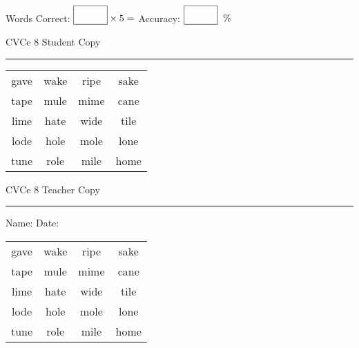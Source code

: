 \documentclass{memoir}
\begin{document}
\small

Words Correct: $\fbox{\phantom{\huge 100}} \times 5 = $ Accuracy: $\fbox{\phantom{\huge 100}}\;\; \%$ 

\vfill

\newpage


\footnotesize \noindent
CVCe 8 \hfill Student Copy
\smallskip
\hrule

\Large

\setlength{\tabcolsep}{14pt}
\def\arraystretch{2}

{\selectfont


\begin{vplace}[0.5]
\begin{center}
\begin{tabular}{cccc}
gave & wake & ripe & sake \\
tape & mule & mime & cane \\
lime & hate & wide & tile \\
lode & hole & mole & lone \\
tune & role & mile & home \\
\end{tabular}
\end{center}
\end{vplace}

}

\newpage

\footnotesize \noindent
CVCe 8 \hfill Teacher Copy
\smallskip
\hrule

\small

\vfill

\noindent
Name: \underline{\hspace{1.75in}} \hfill Date: \underline{\hspace{1in}}

\Large

{\selectfont


\begin{vplace}[0.5]
\begin{center}
\begin{tabular}{cccc}
gave & wake & ripe & sake \\
tape & mule & mime & cane \\
lime & hate & wide & tile \\
lode & hole & mole & lone \\
tune & role & mile & home \\
\end{tabular}
\end{center}
\end{vplace}



}
\end{document}
